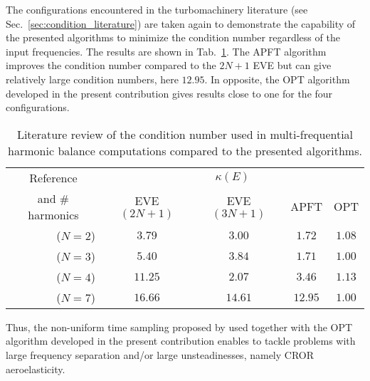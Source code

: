 The configurations encountered in the turbomachinery literature 
(see Sec.~\ref{sec:condition_literature})
are taken again to demonstrate the capability of the presented
algorithms to minimize the condition number
regardless of the input frequencies. The results are shown in 
Tab.~\ref{tab:literature_multistage2}.
The APFT algorithm improves the condition number compared to the
$2N+1$ EVE but can give relatively large condition numbers, here $12.95$. 
In opposite, the OPT algorithm developed in the
present contribution gives results close to one for the four configurations.
\begin{table}[htb]
  \centering
  \begin{tabular}{rcccc}
    \toprule
    \multicolumn{1}{c}{Reference} & \multicolumn{4}{c}{$\kappa(E)$} \\
    \multicolumn{1}{c}{and \# harmonics} & EVE $(2N+1)$ & EVE $(3N+1)$ & APFT & OPT \\
    \midrule
    \citet{Gopinath2007} ($N=2$) & $\mathbf{3.79}$ & $3.00$ & $1.72$ & $1.08$ \\
    \citet{Ekici2007} ($N=3$) & $5.40$ & $\mathbf{3.84}$ & $1.71$ & $1.00$ \\
    \citet{Gopinath2007} ($N=4$) & $\mathbf{11.25}$ & $2.07$ & $3.46$ & $1.13$ \\
    \citet{Gopinath2007} ($N=7$) & $\mathbf{16.66}$ & $14.61$ & $12.95$ & $1.00$ \\
    \bottomrule
  \end{tabular}
  \caption{Literature review of the condition number used in multi-frequential
  harmonic balance computations compared to the presented algorithms.}
  \label{tab:literature_multistage2}
\end{table}


Thus, the non-uniform time sampling proposed by \citet{ThesisGuedeney}
used together with the OPT algorithm developed in the present contribution
enables to tackle problems with large frequency separation and/or large unsteadinesses,
namely CROR aeroelasticity.


